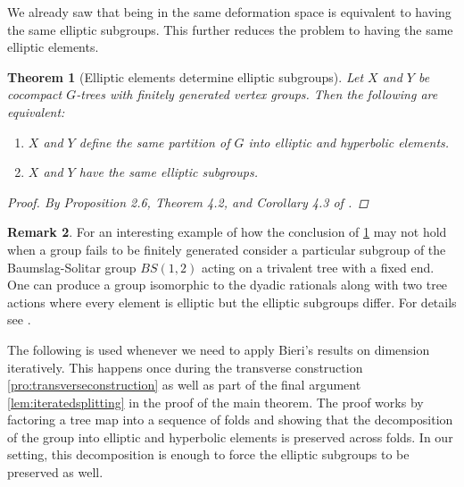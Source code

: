 \documentclass[12pt,parskip=full]{report}
\theoremstyle{plain}
\newtheorem{thm}{Theorem}[section]
\theoremstyle{definition}
\newtheorem{rmk}[thm]{Remark}
\begin{document}
We already saw that being in the same deformation space is equivalent to having the same elliptic subgroups. This further reduces the problem to having the same elliptic elements. 

\begin{thm}
    [Elliptic elements determine elliptic subgroups]
    \label{thm:ellelesubgroups} 
    Let \(X\) and \(Y\) be cocompact \(G\)-trees with finitely generated vertex groups. Then the following are equivalent:
    \begin{enumerate}
        \item \(X\) and \(Y\) define the same partition of \(G\) into elliptic and hyperbolic elements.
        \item \(X\) and \(Y\) have the same elliptic subgroups.
    \end{enumerate}

    \begin{proof}
    By Proposition 2.6, Theorem 4.2, and Corollary 4.3 of \cite{foresterdeformationrigidity}.
    \end{proof}
\end{thm}

\begin{rmk}
    For an interesting example of how the conclusion of \ref{thm:ellelesubgroups} may not hold when a group fails to be finitely generated consider a particular subgroup of the Baumslag-Solitar group \(BS(1,2)\) acting on a trivalent tree with a fixed end. One can produce a group isomorphic to the dyadic rationals along with two tree actions where every element is elliptic but the elliptic subgroups differ. For details see \cite{foresterdeformationrigidity}. 
\end{rmk}

The following is used whenever we need to apply Bieri's results on dimension iteratively. This happens once during the transverse construction \ref{pro:transverseconstruction} as well as part of the final argument \ref{lem:iteratedsplitting} in the proof of the main theorem. The proof works by factoring a tree map into a sequence of folds and showing that the decomposition of the group into elliptic and hyperbolic elements is preserved across folds. In our setting, this decomposition is enough to force the elliptic subgroups to be preserved as well.
\end{document}
